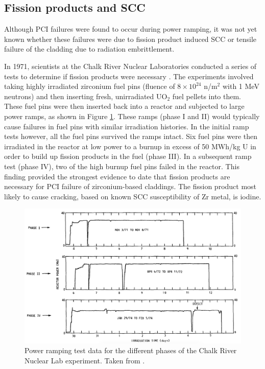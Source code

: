 \subsection{Fission products and SCC}

Although PCI failures were found to occur during power ramping, it was not yet known whether these failures were due to fission product induced SCC or tensile failure of the cladding due to radiation embrittlement. 

In 1971, scientists at the Chalk River Nuclear Laboratories conducted a series of tests to determine if fission products were necessary \cite{MacDonald1979}. The experiments involved taking highly irradiated zirconium fuel pins (fluence of $8 \times 10^{24}$ n/m$^{2}$ with 1 MeV neutrons) and then inserting fresh, unirradiated UO$_{2}$ fuel pellets into them. These fuel pins were then inserted back into a reactor and subjected to large power ramps, as shown in Figure \ref{figure:fueltests}. These ramps (phase I and II) would typically cause failures in fuel pins with similar irradiation histories. In the initial ramp tests however, all the fuel pins survived the ramps intact. Six fuel pins were then irradiated in the reactor at low power to a burnup in excess of 50 MWh/kg U in order to build up fission products in the fuel (phase III). In a subsequent ramp test (phase IV), two of the high burnup fuel pins failed in the reactor. This finding provided the strongest evidence to date that fission products are necessary for PCI failure of zirconium-based claddings. The fission product most likely to cause cracking, based on known SCC susceptibility of Zr metal, is iodine.

\begin{landscape}
\begin{figure}[ht]
\centering
\includegraphics[width=\linewidth]{images/fueltests.png}
\caption[Power ramping test data for the different phases of the Chalk River Nuclear Lab experiment.]{Power ramping test data for the different phases of the Chalk River Nuclear Lab experiment. Taken from \cite{MacDonald1979}.}
\label{figure:fueltests}
\end{figure}
\end{landscape}

